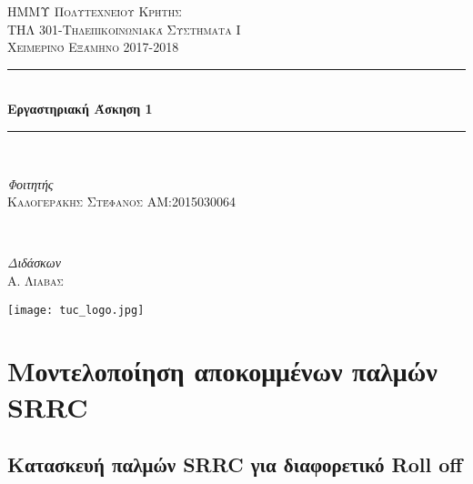 \documentclass[11pt]{article}
\newcommand{\HRule}{\rule{\linewidth}{0.5mm}}
\newcommand{\np}{\newpage}	%
\begin{document}
\begin{titlepage}
	\begin{center}
	\textsc{\LARGE ΗΜΜΥ Πολυτεχνείου Κρήτης}\\[1.5cm]
	
	\textsc{\Large ΤΗΛ 301-Τηλεπικοινωνιακά Συστήματα Ι}\\[0.5cm] 
	
	\textsc{\large Χειμερινό Εξάμηνο 2017-2018}\\[0.5cm]
	
	\HRule\\[0.45cm]
	\huge{\bfseries Εργαστηριακή Άσκηση 1}\\
	[2mm]
	\HRule\\[1.5cm]
	
	\begin{minipage}{0.4\textwidth}
		\begin{flushleft}
			\large
			\textit{Φοιτητής}\\
			\textsc{Καλογεράκης Στέφανος}
			\textsc{ΑΜ:2015030064}
		\end{flushleft}
	\end{minipage}
	~
	\begin{minipage}{0.4\textwidth}
		\begin{flushright}
			\large
			\textit{Διδάσκων}\\
			\textsc{Α. Λιαβας} %
		\end{flushright}
	\end{minipage}
	
	\vfill
    \texttt{[image: tuc\_logo.jpg]} %
    \vfill
    
	\end{center}
\end{titlepage}


\thispagestyle{empty}
\np
\tableofcontents
\np

\section{Μοντελοποίηση αποκομμένων παλμών \foreignlanguage{english}{SRRC}  }

\subsection{Κατασκευή παλμών \foreignlanguage{english}{SRRC} για διαφορετικό \foreignlanguage{english}{Roll off} }
\end{document}
